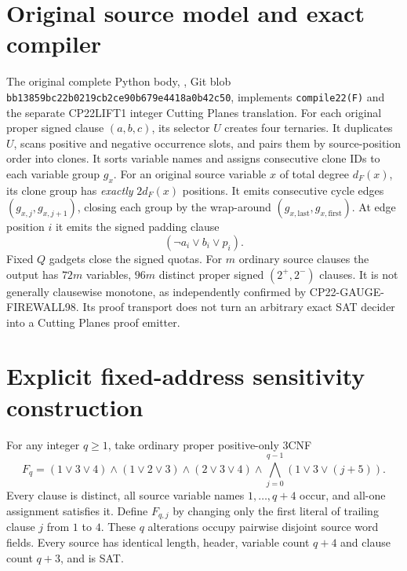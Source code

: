 \documentclass[11pt]{article}
\begin{document}
\section{Original source model and exact compiler}
The original complete Python body, , Git blob \texttt{bb13859bc22b0219cb2ce90b679e4418a0b42c50}, implements \texttt{compile22(F)} and the separate CP22LIFT1 integer Cutting Planes translation. For each original proper signed clause \((a,b,c)\), its selector \(U\) creates four ternaries. It duplicates \(U\), scans positive and negative occurrence slots, and pairs them by source-position order into clones. It sorts variable names and assigns consecutive clone IDs to each variable group \(g_x\). For an original source variable \(x\) of total degree \(d_F(x)\), its clone group has \emph{exactly} \(2d_F(x)\) positions. It emits consecutive cycle edges \((g_{x,j},g_{x,j+1})\), closing each group by the wrap-around \((g_{x,\mathrm{last}},g_{x,\mathrm{first}})\). At edge position \(i\) it emits the signed padding clause
\[
(\neg a_i\vee b_i\vee p_i).
\]
Fixed \(Q\) gadgets close the signed quotas. For \(m\) ordinary source clauses the output has \(72m\) variables, \(96m\) distinct proper signed \((2^+,2^-)\) clauses. It is not generally clausewise monotone, as independently confirmed by CP22-GAUGE-FIREWALL98. Its proof transport does not turn an arbitrary exact SAT decider into a Cutting Planes proof emitter.
\section{Explicit fixed-address sensitivity construction}
For any integer \(q\ge1\), take ordinary proper positive-only 3CNF
\[
F_q=(1\vee3\vee4)\wedge(1\vee2\vee3)\wedge(2\vee3\vee4)
\wedge\bigwedge_{j=0}^{q-1}(1\vee3\vee(j+5)).
\]
Every clause is distinct, all source variable names \(1,\ldots,q+4\) occur, and all-one assignment satisfies it. Define \(F_{q,j}\) by changing only the first literal of trailing clause \(j\) from \(1\) to \(4\). These \(q\) alterations occupy pairwise disjoint source word fields. Every source has identical length, header, variable count \(q+4\) and clause count \(q+3\), and is SAT.
\end{document}
